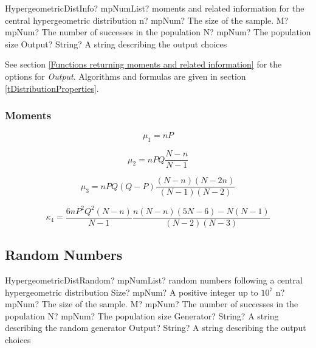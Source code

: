 \begin{mpFunctionsExtract}
	\mpFunctionFourNotImplemented
	{HypergeometricDistInfo? mpNumList? moments and related information for the central hypergeometric distribution}
	{n? mpNum? The size of the sample.}
	{M? mpNum? The number of successes in the population}
	{N? mpNum? The population size}
	{Output? String? A string describing the output choices}
\end{mpFunctionsExtract}

\vspace{0.3cm}

See section \ref{Functions returning moments and related information} for the options for {\itshape\sffamily Output}. Algorithms and formulas are given in section \ref{tDistributionProperties}.

\subsubsection{Moments}

\begin{equation} 
	\mu_1 = nP
\end{equation}

\begin{equation} 
	\mu_2 = nPQ \frac{N-n}{N-1}
\end{equation}

\begin{equation} 
	\mu_3 = nPQ (Q-P) \frac{(N-n)(N-2n)}{(N-1)(N-2)}
\end{equation}

\begin{equation} 
	\kappa_4 = \frac{6nP^2Q^2(N-n)}{N-1} \frac{n(N-n)(5N-6)-N(N-1)}{(N-2)(N-3)}
\end{equation}





\subsection{Random Numbers}

\begin{mpFunctionsExtract}
	\mpFunctionSixNotImplemented
	{HypergeometricDistRandom? mpNumList? random numbers following a central hypergeometric distribution}
	{Size? mpNum? A positive integer up to $10^7$}
	{n? mpNum? The size of the sample.}
	{M? mpNum? The number of successes in the population}
	{N? mpNum? The population size}
	{Generator? String? A string describing the random generator}
	{Output? String? A string describing the output choices}
\end{mpFunctionsExtract}

